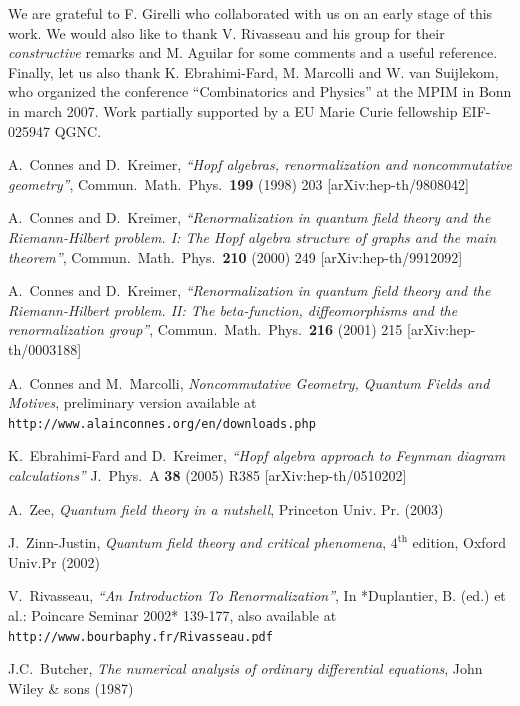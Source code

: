 \documentclass[12pt,here,feynmf]{article}
\begin{document}
We are grateful to F. Girelli who collaborated with us on an early stage of this work. We would also like to thank V. Rivasseau and his group for their \emph{constructive} remarks and M. Aguilar for some comments and a useful reference. Finally, let us also thank K. Ebrahimi-Fard, M. Marcolli and W. van Suijlekom, who organized the conference ``Combinatorics and Physics'' at the MPIM in Bonn in march 2007. Work partially supported by a EU Marie Curie fellowship EIF-025947 QGNC.

\begin{thebibliography}{99}
  A.~Connes and D.~Kreimer,
  {\it ``Hopf algebras, renormalization and noncommutative geometry''},
  Commun.\ Math.\ Phys.\  {\bf 199} (1998) 203
  [arXiv:hep-th/9808042]


  A.~Connes and D.~Kreimer,
  {\it ``Renormalization in quantum field theory and the Riemann-Hilbert  problem.
  I: The Hopf algebra structure of graphs and the main theorem''},
  Commun.\ Math.\ Phys.\  {\bf 210} (2000) 249
  [arXiv:hep-th/9912092]

  A.~Connes and D.~Kreimer,
  {\it ``Renormalization in quantum field theory and the Riemann-Hilbert  problem.
  II: The beta-function, diffeomorphisms and the renormalization  group''},
  Commun.\ Math.\ Phys.\  {\bf 216} (2001) 215
  [arXiv:hep-th/0003188]

A.~Connes and M.~Marcolli, {\it Noncommutative Geometry, Quantum Fields and Motives}, preliminary version available at {\tt http://www.alainconnes.org/en/downloads.php}

  K.~Ebrahimi-Fard and D.~Kreimer,
  {\it ``Hopf algebra approach to Feynman diagram calculations''}
  J.\ Phys.\ A  {\bf 38} (2005) R385
  [arXiv:hep-th/0510202]

  A.~Zee,
  {\it Quantum field theory in a nutshell}, Princeton Univ. Pr. (2003)

J.~Zinn-Justin,
  {\it Quantum field theory and critical phenomena}, $4^{\mathrm{th}}$ edition,
  Oxford Univ.Pr (2002) 


  V.~Rivasseau,
  {\it ``An Introduction To Renormalization''},
  In *Duplantier, B. (ed.) et al.: Poincare Seminar 2002* 139-177, also available at {\tt http://www.bourbaphy.fr/Rivasseau.pdf}

J.C.~Butcher, {\it The numerical analysis of ordinary differential equations}, John Wiley \& sons (1987) 



\end{thebibliography}
\end{document}
